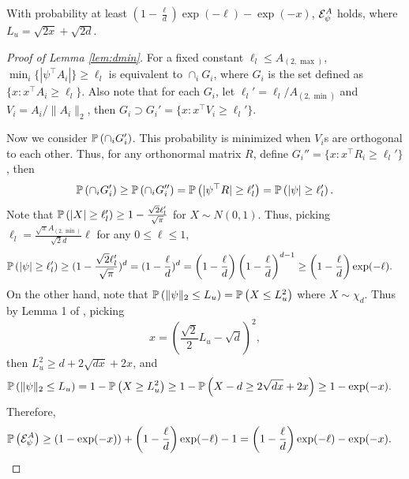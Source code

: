 \begin{lemma}
	\label{lem:dmin}
	With probability at least $\left(1- \frac{\ell}{d}\right)\exp(-\ell) - \exp(-x)$, $\mathcal{E}^A_{\psi}$ holds, where $L_u = \sqrt{2x} +\sqrt{2d}$.
\end{lemma}
\begin{proof}[Proof of Lemma \ref{lem:dmin}]
	For a fixed constant $\ell_l \le A_{(2,\max)}$, $\min_i \{|\psi^{\top}A_i|\} \ge \ell_l$ is equivalent to  $\cap_i G_i$, where $G_i$ is the set defined as $\{x: x^{\top}A_i\ge \ell_l\}$.  
	Also note that for each $G_i$, let $\ell_l' = \ell_l/A_{(2,\min)}$ and $V_i = A_i/\|A_i\|_2$, then $G_i \supset G_i' = \{x: x^{\top}V_i\ge \ell_l'\}$.
	
	Now we consider $\mathbb{P}\left(\cap_i G_i'\right)$. 
	This probability is minimized when $V_i$s are orthogonal to each other. 
	Thus, for any orthonormal matrix $R$, define $G_i'' = \{x: x^{\top}R_i\ge \ell_l'\}$, then 
	\[
	\mathbb{P}\left(\cap_i G_i'\right) \ge \mathbb{P}\left(\cap_i G_i''\right) = \mathbb{P}\left(|\psi^{\top}R| \ge \ell_l'\right) = \mathbb{P}\left(|\psi| \ge \ell_l'\right).
	\]
	Note that $\mathbb{P}\left(|X|\ge \ell_l'\right) \ge 1- \frac{\sqrt{2}\ell_l'}{\sqrt{\pi}}$ for $X\sim N(0,1)$. Thus, picking $\ell_l = \frac{\sqrt{\pi}A_{(2,\min)}}{\sqrt{2}d} \ell$ for any $0\le \ell \le 1$, 
	\begin{align}
	\label{eq:GaussianLowerBound}
	\begin{split}
	& \mathbb{P}\left(|\psi| \ge \ell_l'\right) \ge (1- \frac{\sqrt{2}\ell_l'}{\sqrt{\pi}})^d = (1-\frac{\ell}{d})^d = \left(1- \frac{\ell}{d}\right)\left(1-\frac{\ell}{d}\right)^{d-1} \ge \left(1- \frac{\ell}{d}\right)\exp(-\ell).
	\end{split}
	\end{align}
	On the other hand, note that $\mathbb{P}\left(\|\psi\|_2 \le L_u\right) = \mathbb{P}\left(X \le L_u^2\right)$ where $X \sim \chi_d$.
	Thus by Lemma 1 of \citep{laurent2000adaptive}, picking
	\[
	x = \left(\frac{\sqrt{2}}{2}L_u - \sqrt{d}\right)^2,
	\]
	then $L_u^2 \ge d+2\sqrt{dx}+2x$, and
	\begin{align}
	\label{eq:ProbEpsi}
	\begin{split}
	& \mathbb{P}\left(\|\psi\|_2 \le L_u\right) = 1- \mathbb{P}\left(X\ge L_u^2\right) \ge 1- \mathbb{P}\left(X - d\ge 2\sqrt{dx} +2x\right) \ge 1-\exp(-x).
	\end{split}
	\end{align}
	Therefore, 
	\begin{align}
	\label{eq:ProbEpsi2}
	\begin{split}
	& \mathbb{P}\left(\mathcal{E}^A_{\psi}\right) \ge (1-\exp(-x))+\left(1- \frac{\ell}{d}\right)\exp(-\ell)-1 = \left(1- \frac{\ell}{d}\right)\exp(-\ell)-\exp(-x).
	\end{split}
	\end{align}
\end{proof}

